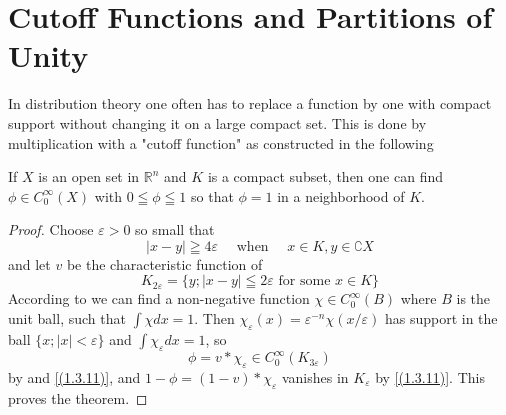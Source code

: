 \section{Cutoff Functions and Partitions of Unity}
In distribution theory one often has to replace a function by one with compact support without changing it on a large compact set. This is done by multiplication with a "cutoff function" as constructed in the following
\begin{theorem}
    If $X$ is an open set in $\mathbb{R}^{n}$ and $K$ is a compact subset, then one can find $\phi \in C_{0}^{\infty}(X)$ with $0 \leqq \phi \leqq 1$ so that $\phi=1$ in a neighborhood of $K$.
\end{theorem}
\begin{proof}
    Choose $\varepsilon>0$ so small that
\begin{equation}
    \label{(1.4.1)}
	|x-y| \geqq 4 \varepsilon \quad \text { when } \quad x \in K, y \in\complement X
\end{equation}
and let $v$ be the characteristic function of
\[
	K_{2 \varepsilon}=\{y ;|x - y| \leqq 2 \varepsilon \text { for some } x \in K\}
\]
According to  we can find a non-negative function $\chi \in C_{0}^{\infty}(B)$ where $B$ is the unit ball, such that $\int \chi d x=1$. Then $\chi_{\varepsilon}(x)=\varepsilon^{-n} \chi(x / \varepsilon)$ has support in the ball $\{x ;|x|<\varepsilon\}$ and $\int \chi_{\varepsilon} d x=1$, so
\[
	\phi=v * \chi_{\varepsilon} \in C_{0}^{\infty}\left(K_{3 \varepsilon}\right)
\]
by  and \eqref{(1.3.11)}, and $1-\phi=(1-v) * \chi_{\varepsilon}$ vanishes in $K_{\varepsilon}$ by \eqref{(1.3.11)}. This proves the theorem.
\end{proof}

